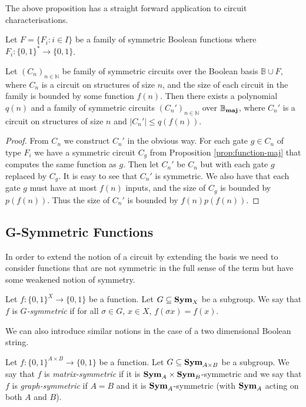 \documentclass[../paper.tex]{subfiles}
\begin{document}
The above proposition has a straight forward application to circuit
characterisations.

\begin{thm}
  Let $F = \{F_i : i \in I \}$ be a family of symmetric Boolean functions where
  $F_i: \{0,1\}^* \rightarrow \{ 0,1 \}$.

  Let $(C_n)_{n \in \mathbb{N}}$ be family of symmetric circuits over the
  Boolean basis $\mathbb{B} \cup F$, where $C_n$ is a circuit on structures of
  size $n$, and the size of each circuit in the family is bounded by some
  function $f(n)$. Then there exists a polynomial $q(n)$ and a family of
  symmetric circuits $(C_n')_{n \in \mathbb{N}}$ over $\mathbb{B}_{\text{\textbf{maj}}}$, where
  $C_n'$ is a circuit on structures of size $n$ and $\vert C_n' \vert \leq
  q(f(n))$.
\end{thm}

\begin{proof}
  From $C_n$ we construct $C_n'$ in the obvious way. For each gate $g \in C_n$
  of type $F_i$ we have a symmetric circuit $C_g$ from Proposition
  \ref{prop:function-maj} that computes the same function as $g$. Then let
  $C_n'$ be $C_n$ but with each gate $g$ replaced by $C_g$. It is easy to see
  that $C_n'$ is symmetric. We also have that each gate $g$ must have at most
  $f(n)$ inputs, and the size of $C_g$ is bounded by $p(f(n))$. Thus the size of
  $C_n'$ is bounded by $f(n)p(f(n))$.
\end{proof}

\subsection{G-Symmetric Functions}
In order to extend the notion of a circuit by extending the basis we need to
consider functions that are not symmetric in the full sense of the term but have
some weakened notion of symmetry.

\begin{definition}
  Let $f: \{0,1\}^X \rightarrow \{0,1\}$ be a function. Let $G \subseteq \text{\textbf{Sym}}_X$
  be a subgroup. We say that $f$ is \emph{$G$-symmetric} if for all $\sigma \in
  G$, $x \in X$, $f(\sigma x) = f(x)$.
\end{definition}

We can also introduce similar notions in the case of a two dimensional Boolean
string.

\begin{definition}
  Let $f: \{0,1\}^{A \times B} \rightarrow \{0,1\}$ be a function. Let $G
  \subseteq \text{\textbf{Sym}}_{A \times B}$ be a subgroup. We say that $f$ is
  \emph{matrix-symmetric} if it is $\text{\textbf{Sym}}_A \times \text{\textbf{Sym}}_B$-symmetric and we say
  that $f$ is \emph{graph-symmetric} if $A = B$ and it is $\text{\textbf{Sym}}_A$-symmetric
  (with $\text{\textbf{Sym}}_A$ acting on both $A$ and $B$).
\end{definition}
\end{document}
